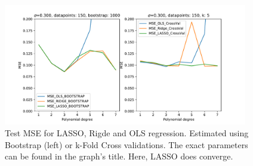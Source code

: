 \documentclass[11pt,a4paper,titlepage]{article}
\begin{document}
\begin{figure}[H]
\centering
\includegraphics[width=0.95\textwidth]{MSE_different_methods_Franke_small.pdf}
\caption[Test MSE for LASSO, Rigde and OLS regression (Franke, small)]{Test MSE for LASSO, Rigde and OLS regression. Estimated using Bootstrap (left) or k-Fold Cross validations. The exact parameters can be found in the graph's title. Here, LASSO does converge.}
\label{fig:ConvergingLasso_Franke}
\end{figure}
\end{document}
